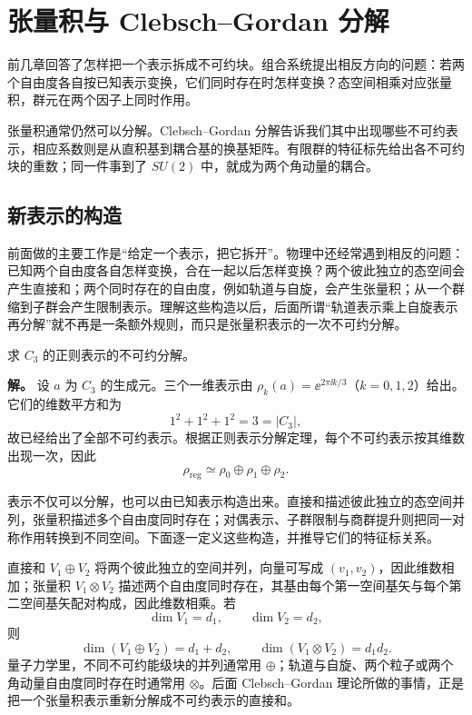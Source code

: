 \section{张量积与 Clebsch--Gordan 分解}
\label{chap:tensor-product-cg}

前几章回答了怎样把一个表示拆成不可约块。组合系统提出相反方向的问题：若两个自由度各自按已知表示变换，它们同时存在时怎样变换？态空间相乘对应张量积，群元在两个因子上同时作用。

张量积通常仍然可以分解。Clebsch--Gordan 分解告诉我们其中出现哪些不可约表示，相应系数则是从直积基到耦合基的换基矩阵。有限群的特征标先给出各不可约块的重数；同一件事到了 \(SU(2)\) 中，就成为两个角动量的耦合。

\subsection{新表示的构造}
\label{sec:new-constructions}

前面做的主要工作是“给定一个表示，把它拆开”。物理中还经常遇到相反的问题：已知两个自由度各自怎样变换，合在一起以后怎样变换？两个彼此独立的态空间会产生直接和；两个同时存在的自由度，例如轨道与自旋，会产生张量积；从一个群缩到子群会产生限制表示。理解这些构造以后，后面所谓“轨道表示乘上自旋表示再分解”就不再是一条额外规则，而只是张量积表示的一次不可约分解。

\begin{workedexample}
求 $C_3$ 的正则表示的不可约分解。

\textbf{解。} 设 $a$ 为 $C_3$ 的生成元。三个一维表示由 $\rho_k(a)=\ee^{2\pi\ii k/3}$（$k=0,1,2$）给出。它们的维数平方和为
\[
1^2+1^2+1^2=3=|C_3|,
\]
故已经给出了全部不可约表示。根据正则表示分解定理，每个不可约表示按其维数出现一次，因此
\[
\rho_{\mathrm{reg}}\simeq \rho_0\oplus \rho_1\oplus \rho_2.
\]
\end{workedexample}


表示不仅可以分解，也可以由已知表示构造出来。直接和描述彼此独立的态空间并列，张量积描述多个自由度同时存在；对偶表示、子群限制与商群提升则把同一对称作用转换到不同空间。下面逐一定义这些构造，并推导它们的特征标关系。



直接和 $V_1\oplus V_2$ 将两个彼此独立的空间并列，向量可写成 $(v_1,v_2)$，因此维数相加；张量积 $V_1\otimes V_2$ 描述两个自由度同时存在，其基由每个第一空间基矢与每个第二空间基矢配对构成，因此维数相乘。若
\[
\dim V_1=d_1,\qquad \dim V_2=d_2,
\]
则
\[
\dim(V_1\oplus V_2)=d_1+d_2,
\qquad
\dim(V_1\otimes V_2)=d_1d_2.
\]
量子力学里，不同不可约能级块的并列通常用 $\oplus$；轨道与自旋、两个粒子或两个角动量自由度同时存在时通常用 $\otimes$。后面 Clebsch--Gordan 理论所做的事情，正是把一个张量积表示重新分解成不可约表示的直接和。

